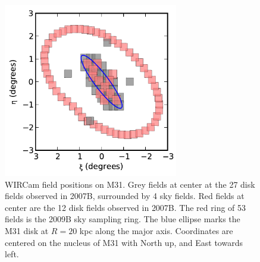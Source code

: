 \documentclass[iop]{emulateapj}
\begin{document}
\begin{figure}[t]
	\centering
		\includegraphics[width=3in]{figs/fieldmap}
	\caption{WIRCam field positions on M31. Grey fields at center at the 27 disk fields observed in 2007B, surrounded by 4 sky fields. Red fields at center are the 12 disk fields observed in 2007B. The red ring of 53 fields is the 2009B sky sampling ring. The blue ellipse marks the M31 disk at $R=20$ kpc along the major axis. Coordinates are centered on the nucleus of M31 with North up, and East towards left.}
	\label{fig:fieldmap}
\end{figure}

\end{document}
